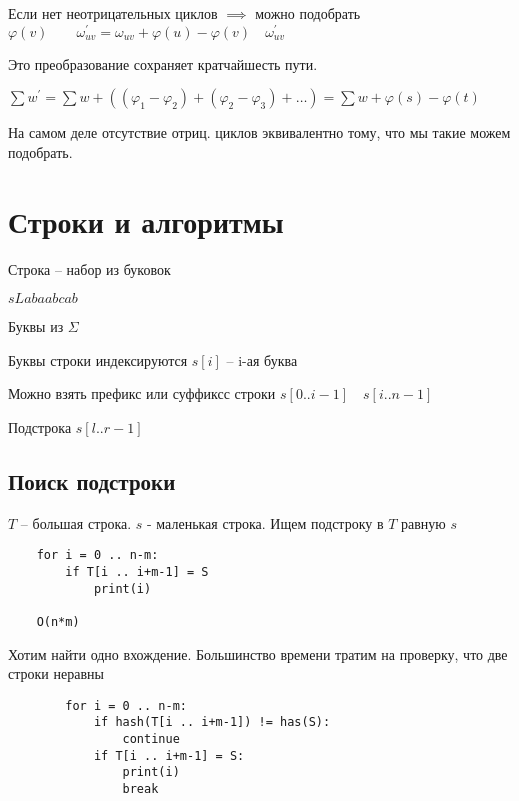 \documentclass{book}
\newcommand{\p}[1]{#1^{\prime}}
\theoremstyle{definition}
\begin{document}
Если нет неотрицательных циклов $\implies $ можно подобрать $\varphi(v)\qquad \p \omega_{uv} = \omega_{uv} + \varphi(u) - \varphi(v)\quad \p \omega_{uv}$

Это преобразование сохраняет кратчайшесть пути.

$\sum \p w = \sum w + \left( \left( \varphi_1 - \varphi_2 \right) + \left( \varphi_2 - \varphi_3 \right) +\ldots \right)  = \sum w + \varphi(s) - \varphi(t)$

На самом деле отсутствие отриц. циклов эквивалентно тому, что мы такие можем подобрать.


\section{Строки и алгоритмы}

\begin{definition}
    Строка -- набор из буковок

    $sL abaabcab$

    Буквы из  $\Sigma$

    Буквы строки индексируются  $s[i]$ -- i-ая буква

    Можно взять префикс или суффиксс строки $s[0 .. i-1] \quad s[i .. n-1]$

    Подстрока  $s[l .. r-1]$
\end{definition}

\subsection{Поиск подстроки}

$T$ -- большая строка.  $s$ - маленькая строка. Ищем подстроку в  $T$ равную  $s$

\begin{lstlisting}
    for i = 0 .. n-m:
        if T[i .. i+m-1] = S
            print(i)

    O(n*m)
\end{lstlisting}

\begin{theorem}

    Хотим найти одно вхождение. Большинство времени тратим на проверку, что две строки неравны

    \begin{lstlisting}
        for i = 0 .. n-m:
            if hash(T[i .. i+m-1]) != has(S):
                continue
            if T[i .. i+m-1] = S:
                print(i)
                break
    \end{lstlisting}

\end{theorem}
\end{document}
